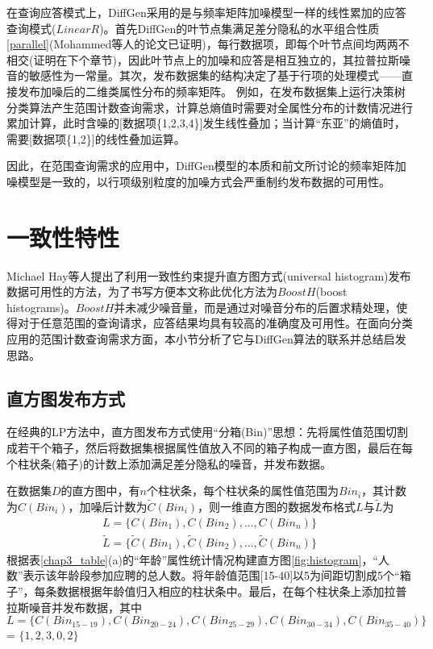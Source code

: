 在查询应答模式上，DiffGen采用的是与频率矩阵加噪模型一样的线性累加的应答查询模式($LinearR$)。首先DiffGen的叶节点集满足差分隐私的水平组合性质\ref{parallel}(Mohammed等人的论文\cite{DiffGen}已证明)，每行数据项，即每个叶节点间均两两不相交(证明在下个章节)，因此叶节点上的加噪和应答是相互独立的，其拉普拉斯噪音的敏感性为一常量。其次，发布数据集的结构决定了基于行项的处理模式——直接发布加噪后的二维类属性分布的频率矩阵。
例如，在发布数据集上运行决策树分类算法产生范围计数查询需求，计算总熵值时需要对全属性分布的计数情况进行累加计算，此时含噪的[数据项\{1,2,3,4\}]发生线性叠加；当计算“东亚”的熵值时，需要[数据项\{1,2\}]的线性叠加运算。

因此，在范围查询需求的应用中，DiffGen模型的本质和前文所讨论的频率矩阵加噪模型是一致的，以行项级别粒度的加噪方式会严重制约发布数据的可用性。


\section{一致性特性}

Michael Hay等人提出了利用一致性约束提升直方图方式(universal histogram)发布数据可用性的方法\cite{boosting}，为了书写方便本文称此优化方法为$BoostH$(boost histograms)。$BoostH$并未减少噪音量，而是通过对噪音分布的后置求精处理，使得对于任意范围的查询请求，应答结果均具有较高的准确度及可用性。在面向分类应用的范围计数查询需求方面，本小节分析了它与DiffGen算法的联系并总结启发思路。

\subsection{直方图发布方式}  %
\label{LP_publish}
在经典的LP\cite{Dwork Calibrating}方法中，直方图发布方式使用“分箱(Bin)”思想：先将属性值范围切割成若干个箱子，然后将数据集根据属性值放入不同的箱子构成一直方图，最后在每个柱状条(箱子)的计数上添加满足差分隐私的噪音，并发布数据。

在数据集$D$的直方图中，有$n$个柱状条，每个柱状条的属性值范围为$Bin_{i}$，其计数为$C(Bin_{i})$，加噪后计数为$\tilde{C}(Bin_{i})$，则一维直方图的数据发布格式$L$与$\tilde{L}$为
\[
\begin{split}
	L = \{C(Bin_{1}),C(Bin_{2}),...,C(Bin_{n})\}\\
	\tilde{L} = \{\tilde{C}(Bin_{1}),\tilde{C}(Bin_{2}),...,\tilde{C}(Bin_{n})\}	
\end{split}
\]
根据表\ref{chap3_table}(a)的“年龄”属性统计情况构建直方图\ref{fig:histogram}，“人数”表示该年龄段参加应聘的总人数。将年龄值范围[15-40]以5为间距切割成5个“箱子”，每条数据根据年龄值归入相应的柱状条中。最后，在每个柱状条上添加拉普拉斯噪音并发布数据，其中$L = \{C(Bin_{15-19}),C(Bin_{20-24}),C(Bin_{25-29}),C(Bin_{30-34}),C(Bin_{35-40})\}$ = $\{1,2,3,0,2\}$%

